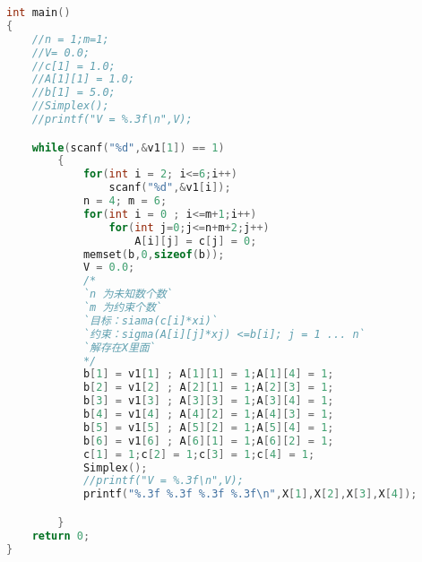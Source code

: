 \begin{lstlisting}[language=c++]
int main()
{
    //n = 1;m=1;
    //V= 0.0;
    //c[1] = 1.0;
    //A[1][1] = 1.0;
    //b[1] = 5.0;
    //Simplex();
    //printf("V = %.3f\n",V);

	while(scanf("%d",&v1[1]) == 1)
        {
            for(int i = 2; i<=6;i++)
                scanf("%d",&v1[i]);
            n = 4; m = 6;
            for(int i = 0 ; i<=m+1;i++)
                for(int j=0;j<=n+m+2;j++)
                    A[i][j] = c[j] = 0;
            memset(b,0,sizeof(b));
            V = 0.0;
            /*
            `n 为未知数个数`
            `m 为约束个数`
            `目标：siama(c[i]*xi)`
            `约束：sigma(A[i][j]*xj) <=b[i]; j = 1 ... n`
            `解存在X里面`
            */
            b[1] = v1[1] ; A[1][1] = 1;A[1][4] = 1;
            b[2] = v1[2] ; A[2][1] = 1;A[2][3] = 1;
            b[3] = v1[3] ; A[3][3] = 1;A[3][4] = 1;
            b[4] = v1[4] ; A[4][2] = 1;A[4][3] = 1;
            b[5] = v1[5] ; A[5][2] = 1;A[5][4] = 1;
            b[6] = v1[6] ; A[6][1] = 1;A[6][2] = 1;
            c[1] = 1;c[2] = 1;c[3] = 1;c[4] = 1;
            Simplex();
            //printf("V = %.3f\n",V);
            printf("%.3f %.3f %.3f %.3f\n",X[1],X[2],X[3],X[4]);

        }
	return 0;
}
    \end{lstlisting}
